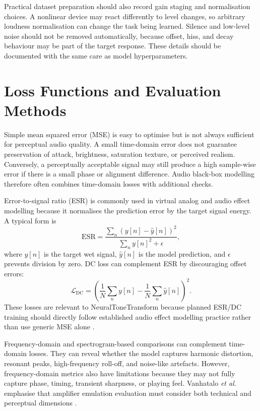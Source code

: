 \documentclass[conference]{IEEEtran}
\begin{document}
Practical dataset preparation should also record gain staging and normalisation choices. A nonlinear device may react differently to level changes, so arbitrary loudness normalisation can change the task being learned. Silence and low-level noise should not be removed automatically, because offset, hiss, and decay behaviour may be part of the target response. These details should be documented with the same care as model hyperparameters.

\section{Loss Functions and Evaluation Methods}

Simple mean squared error (MSE) is easy to optimise but is not always sufficient for perceptual audio quality. A small time-domain error does not guarantee preservation of attack, brightness, saturation texture, or perceived realism. Conversely, a perceptually acceptable signal may still produce a high sample-wise error if there is a small phase or alignment difference. Audio black-box modelling therefore often combines time-domain losses with additional checks.

Error-to-signal ratio (ESR) is commonly used in virtual analog and audio effect modelling because it normalises the prediction error by the target signal energy. A typical form is
\begin{equation}
\mathrm{ESR} = \frac{\sum_n (y[n] - \hat{y}[n])^2}{\sum_n y[n]^2 + \epsilon},
\end{equation}
where $y[n]$ is the target wet signal, $\hat{y}[n]$ is the model prediction, and $\epsilon$ prevents division by zero. DC loss can complement ESR by discouraging offset errors:
\begin{equation}
\mathcal{L}_{\mathrm{DC}} = \left(\frac{1}{N}\sum_n y[n] - \frac{1}{N}\sum_n \hat{y}[n]\right)^2.
\end{equation}
These losses are relevant to NeuralToneTransform because planned ESR/DC training should directly follow established audio effect modelling practice rather than use generic MSE alone \cite{wright2020guitar,ramirez2020blackbox}.

Frequency-domain and spectrogram-based comparisons can complement time-domain losses. They can reveal whether the model captures harmonic distortion, resonant peaks, high-frequency roll-off, and noise-like artefacts. However, frequency-domain metrics also have limitations because they may not fully capture phase, timing, transient sharpness, or playing feel. Vanhatalo \emph{et al.} emphasise that amplifier emulation evaluation must consider both technical and perceptual dimensions \cite{vanhatalo2022review}.
\end{document}

